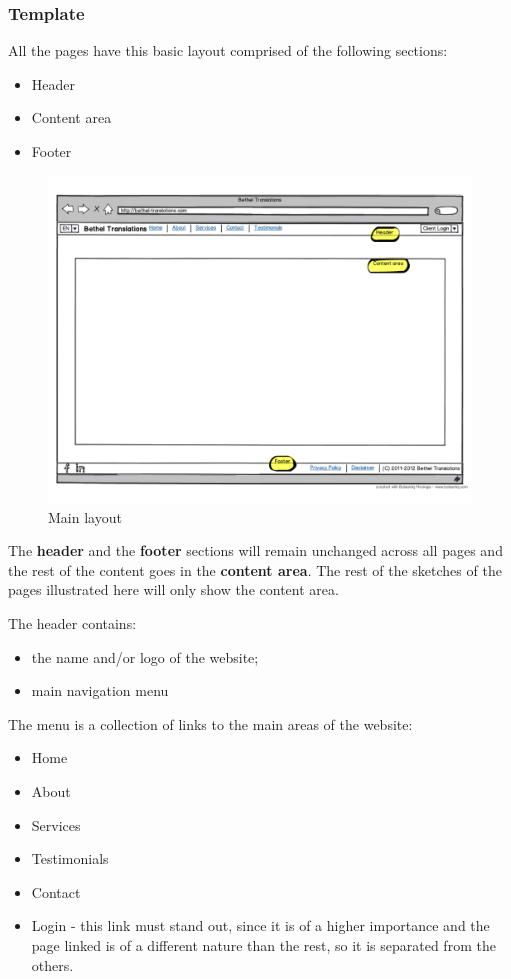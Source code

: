 \documentclass{l3proj}
\begin{document}
\subsubsection*{Template}
All the pages have this basic layout comprised of the following sections:
\begin{itemize} \itemsep1pt \parskip0pt 
	\item Header
	\item Content area
	\item Footer
\end{itemize}

\begin{figure}
\centering
\includegraphics[width=\linewidth, trim = 0px 50px 0px 50px]
	{wireframes/main-layout}
\caption{Main layout}
\label{wireframes-main-layout}
\end{figure}

The \textbf{header} and the \textbf{footer} sections will remain unchanged
across all pages and the rest of the content goes in the \textbf{content area}.
The rest of the sketches of the pages illustrated here will only show the
content area.

The header contains:
\begin{itemize} \itemsep1pt \parskip0pt 
	\item the name and/or logo of the website;
	\item main navigation menu
\end{itemize}

The menu is a collection of links to the main areas of the website:
\begin{itemize} \itemsep1pt \parskip0pt 
	\item Home
	\item About
	\item Services
	\item Testimonials
	\item Contact
	\item Login - this link must stand out, since it is of a higher
	importance and the page linked is of a different nature than the rest,
	so it is separated from the others.
\end{itemize}
\end{document}
